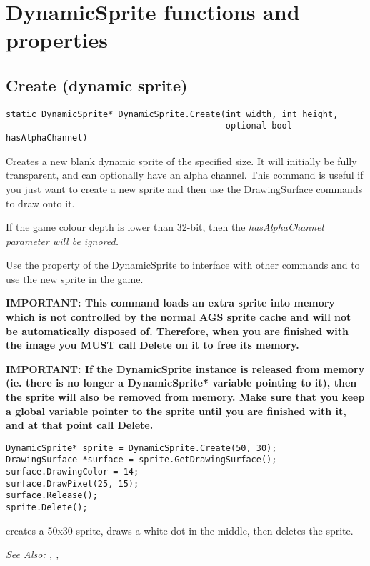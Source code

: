 \section{DynamicSprite functions and properties}%



\subsection{Create (dynamic sprite)}\label{DynamicSprite.Create}%

\begin{verbatim}
static DynamicSprite* DynamicSprite.Create(int width, int height,
                                           optional bool hasAlphaChannel)
\end{verbatim}
Creates a new blank dynamic sprite of the specified size. It will initially be
fully transparent, and can optionally have an alpha channel. This command is
useful if you just want to create a new sprite and then use the DrawingSurface
commands to draw onto it.

If the game colour depth is lower than 32-bit, then the \it{hasAlphaChannel}
parameter will be ignored.

Use the  property of the DynamicSprite to
interface with other commands and to use the new sprite in the game.

\bf{IMPORTANT:} This command loads an extra sprite into memory which is not controlled
by the normal AGS sprite cache and will not be automatically disposed of. Therefore, when
you are finished with the image you \bf{MUST} call Delete on it to free its memory.

\bf{IMPORTANT:} If the DynamicSprite instance is released from memory (ie. there is
no longer a DynamicSprite* variable pointing to it), then the sprite will also be
removed from memory. Make sure that you keep a global variable pointer to the sprite
until you are finished with it, and at that point call Delete.

\begin{verbatim}
DynamicSprite* sprite = DynamicSprite.Create(50, 30);
DrawingSurface *surface = sprite.GetDrawingSurface();
surface.DrawingColor = 14;
surface.DrawPixel(25, 15);
surface.Release();
sprite.Delete();
\end{verbatim}
creates a 50x30 sprite, draws a white dot in the middle, then deletes the sprite.

\it{See Also:} ,
,



